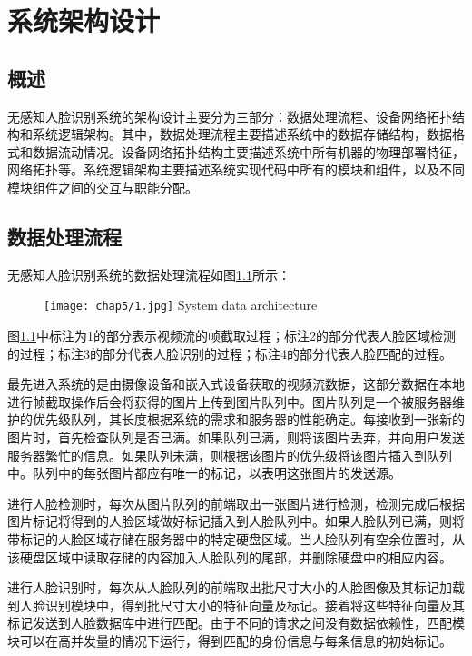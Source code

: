 \chapter{系统架构设计}

\section{概述}

无感知人脸识别系统的架构设计主要分为三部分：数据处理流程、设备网络拓扑结构和系统逻辑架构。其中，数据处理流程主要描述系统中的数据存储结构，数据格式和数据流动情况。设备网络拓扑结构主要描述系统中所有机器的物理部署特征，网络拓扑等。系统逻辑架构主要描述系统实现代码中所有的模块和组件，以及不同模块组件之间的交互与职能分配。

\section{数据处理流程}

无感知人脸识别系统的数据处理流程如图\ref{fig:chap5:data}所示：

\begin{figure}[!htp]
	\centering
	\texttt{[image: chap5/1.jpg]}
	{System data architecture}
	\label{fig:chap5:data}
\end{figure}

图\ref{fig:chap5:data}中标注为1的部分表示视频流的帧截取过程；标注2的部分代表人脸区域检测的过程；标注3的部分代表人脸识别的过程；标注4的部分代表人脸匹配的过程。

最先进入系统的是由摄像设备和嵌入式设备获取的视频流数据，这部分数据在本地进行帧截取操作后会将获得的图片上传到图片队列中。图片队列是一个被服务器维护的优先级队列，其长度根据系统的需求和服务器的性能确定。每接收到一张新的图片时，首先检查队列是否已满。如果队列已满，则将该图片丢弃，并向用户发送服务器繁忙的信息。如果队列未满，则根据该图片的优先级将该图片插入到队列中。队列中的每张图片都应有唯一的标记，以表明这张图片的发送源。

进行人脸检测时，每次从图片队列的前端取出一张图片进行检测，检测完成后根据图片标记将得到的人脸区域做好标记插入到人脸队列中。如果人脸队列已满，则将带标记的人脸区域存储在服务器中的特定硬盘区域。当人脸队列有空余位置时，从该硬盘区域中读取存储的内容加入人脸队列的尾部，并删除硬盘中的相应内容。

进行人脸识别时，每次从人脸队列的前端取出批尺寸大小的人脸图像及其标记加载到人脸识别模块中，得到批尺寸大小的特征向量及标记。接着将这些特征向量及其标记发送到人脸数据库中进行匹配。由于不同的请求之间没有数据依赖性，匹配模块可以在高并发量的情况下运行，得到匹配的身份信息与每条信息的初始标记。

